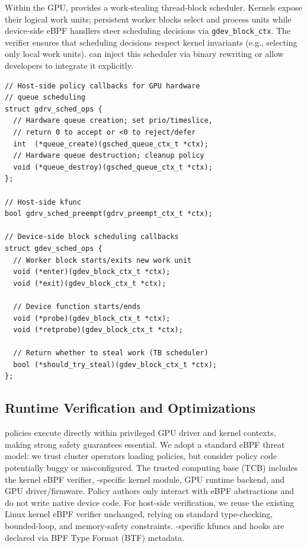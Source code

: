 Within the GPU, \sys provides a work‑stealing thread‑block scheduler. Kernels expose their logical work units; persistent worker blocks select and process units while device‑side eBPF handlers steer scheduling decisions via \texttt{gdev\_block\_ctx}. The verifier ensures that scheduling decisions respect kernel invariants (e.g., selecting only local work units). \sys can inject this scheduler via binary rewriting or allow developers to integrate it explicitly.

\begin{verbatim}
// Host-side policy callbacks for GPU hardware
// queue scheduling
struct gdrv_sched_ops {
  // Hardware queue creation; set prio/timeslice,
  // return 0 to accept or <0 to reject/defer
  int  (*queue_create)(gsched_queue_ctx_t *ctx);
  // Hardware queue destruction; cleanup policy
  void (*queue_destroy)(gsched_queue_ctx_t *ctx);
};

// Host-side kfunc
bool gdrv_sched_preempt(gdrv_preempt_ctx_t *ctx);

// Device-side block scheduling callbacks
struct gdev_sched_ops {
  // Worker block starts/exits new work unit
  void (*enter)(gdev_block_ctx_t *ctx);
  void (*exit)(gdev_block_ctx_t *ctx);
  
  // Device function starts/ends
  void (*probe)(gdev_block_ctx_t *ctx);
  void (*retprobe)(gdev_block_ctx_t *ctx);
  
  // Return whether to steal work (TB scheduler)
  bool (*should_try_steal)(gdev_block_ctx_t *ctx);
};
\end{verbatim}

\subsection{Runtime Verification and Optimizations}
\label{sec:verification}

\sys policies execute directly within privileged GPU driver and kernel contexts, making strong safety guarantees essential. We adopt a standard eBPF threat model: we trust cluster operators loading policies, but consider policy code potentially buggy or misconfigured. The trusted computing base (TCB) includes the kernel eBPF verifier, \sys-specific kernel module, GPU runtime backend, and GPU driver/firmware. Policy authors only interact with eBPF abstractions and do not write native device code. For host-side verification, we reuse the existing Linux kernel eBPF verifier unchanged, relying on standard type-checking, bounded-loop, and memory-safety constraints. \sys-specific kfuncs and hooks are declared via BPF Type Format (BTF) metadata.

